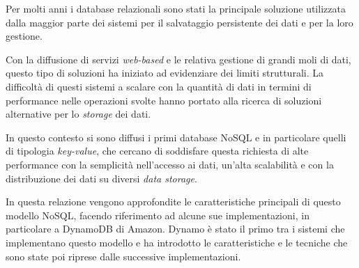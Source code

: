 Per molti anni i database relazionali sono stati la principale soluzione utilizzata dalla maggior parte dei sistemi per il salvataggio persistente dei dati e per la loro gestione.

Con la diffusione di servizi \textit{web-based} e le relativa gestione di grandi moli di dati, questo tipo di soluzioni ha iniziato ad evidenziare dei limiti strutturali. La difficoltà di questi sistemi a scalare con la quantità di dati in termini di performance nelle operazioni svolte hanno portato alla ricerca di soluzioni alternative per lo \textit{storage} dei dati.

In questo contesto si sono diffusi i primi database NoSQL e in particolare quelli di tipologia \textit{key-value}, che cercano di soddisfare questa richiesta di alte performance con la semplicità nell'accesso ai dati, un'alta scalabilità e con la distribuzione dei dati su diversi \textit{data storage}.

In questa relazione vengono approfondite le caratteristiche principali di questo modello NoSQL, facendo riferimento ad alcune sue implementazioni, in particolare a DynamoDB di Amazon. Dynamo è stato il primo tra i sistemi che implementano questo modello e ha introdotto le caratteristiche e le tecniche che sono state poi riprese dalle successive implementazioni.